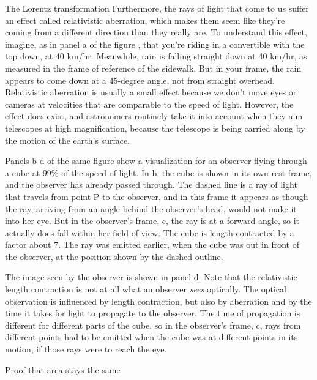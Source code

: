 \begin{section}{The Lorentz transformation}
Furthermore, the rays of light that come to us suffer an effect called relativistic aberration, which makes them seem
like they're coming from a different direction than they really are. To understand this effect, imagine, as in
panel a of the figure , that you're
riding in a convertible with the top down, at 40 km/hr. Meanwhile, rain is falling straight down at 40 km/hr, as measured
in the frame of reference of the sidewalk. But in your frame, the rain appears to come down at a 45-degree angle, not
from straight overhead. Relativistic aberration is usually a small effect because we don't move eyes or cameras at
velocities that are comparable to the speed of light. However, the effect does exist, and astronomers routinely take
it into account when they aim telescopes at high magnification, because the telescope is being carried along by the
motion of the earth's surface.

\pagebreak

Panels b-d of the same figure show a visualization for an observer flying through a cube at 99\% of the speed of light.
In b, the cube is shown in its own rest frame, and
the observer has already passed through. The dashed line is a ray of light that travels
from point P to the observer, and in this frame it appears as though the ray,
arriving from an angle behind the observer's head, would not make it into
her eye.   
But in the observer's frame, c, the ray is at a forward angle,
so it actually does fall within her field of view.
The cube is length-contracted by a factor about 7.
The ray was emitted earlier, when the cube was out in front of the observer, at the position
shown by the dashed outline.

The image seen by the
observer is shown in panel d.
Note that the relativistic length contraction is not at all
what an observer \emph{sees} optically. The optical observation is influenced by length contraction,
but also by aberration and by the time it takes for light to propagate to the observer. The time
of propagation is different for different parts of the cube, so in the observer's frame,
c, rays from different points had to be emitted when the cube was at different
points in its motion, if those rays were to reach the eye.

\vfill

\pagebreak

%
           {Proof that area stays the same}\label{sec:area-proof}


\end{section}
